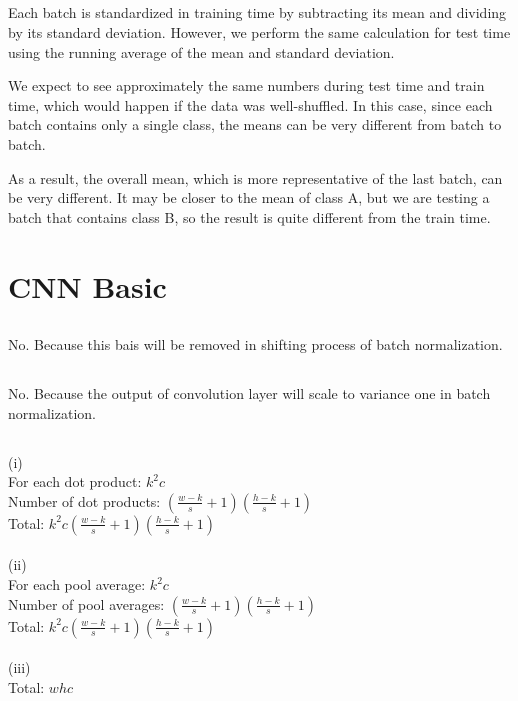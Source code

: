\documentclass{article}
\begin{document}
\subsection{}
Each batch is standardized in training time by subtracting its mean and dividing
 by its standard deviation. However, we perform the same calculation for test time 
 using the running average of the mean and standard deviation.

We expect to see approximately the same numbers during test time and train time,
which would happen if the data was well-shuffled. In this case, since each batch 
contains only a single class, the means can be very different from batch to batch.

As a result, the overall mean, which is more representative of the last batch, can 
be very different. It may be closer to the mean of class A, but we are testing a 
batch that contains class B, so the result is quite different from the train time.


\section{CNN Basic}
\subsection{}
No. Because this bais will be removed in shifting process of batch normalization.


\subsection{}
No. Because the output of convolution layer will scale to variance one in batch normalization.


\subsection{}
(i) \\
For each dot product: $k^2c$ \\
Number of dot products: $(\frac{w - k}{s} + 1)(\frac{h - k}{s} + 1)$ \\
Total: $k^2c(\frac{w - k}{s} + 1)(\frac{h - k}{s} + 1)$ \\
\\
\noindent
(ii) \\ 
For each pool average: $k^2c$ \\
Number of pool averages: $(\frac{w - k}{s} + 1)(\frac{h - k}{s} + 1)$ \\
Total: $k^2c(\frac{w - k}{s} + 1)(\frac{h - k}{s} + 1)$ \\
\\
\noindent
(iii) \\
Total: $whc$
\end{document}
